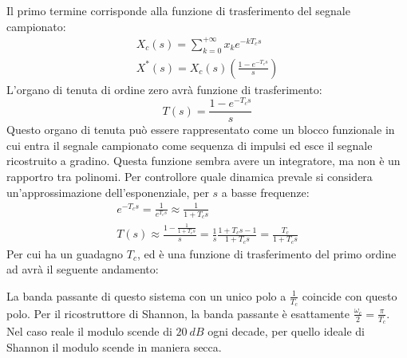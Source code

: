 \documentclass{article}
\numberwithin{equation}{subsection}
\begin{document}
Il primo termine corrisponde alla funzione di trasferimento del segnale campionato:
\begin{gather}
    X_c(s)=\sum_{k=0}^{+\infty}x_ke^{-kT_cs}\\
    X^*(s)=X_c(s)\left(\displaystyle\frac{1-e^{-T_cs}}{s}\right)
\end{gather}
L'organo di tenuta di ordine zero avrà funzione di trasferimento: 
\begin{equation}
    T(s)=\displaystyle\frac{1-e^{-T_cs}}{s}
\end{equation}
Questo organo di tenuta può essere rappresentato come un blocco funzionale in cui entra il segnale campionato come sequenza di impulsi ed esce il segnale ricostruito a gradino. 
Questa funzione sembra avere un integratore, ma non è un rapportro tra polinomi. Per controllore quale dinamica prevale si considera un'approssimazione dell'esponenziale, per 
$s$ a basse frequenze: 
\begin{gather}
    e^{-T_cs}=\displaystyle\frac{1}{e^{T_cs}}\approx\frac{1}{1+T_cs}\\
    T(s)\approx\displaystyle\frac{1-\displaystyle\frac{1}{1+T_cs}}{s}=\frac{1}{s}\frac{1+T_cs-1}{1+T_cs}=\frac{T_c}{1+T_cs}
\end{gather}
Per cui ha un guadagno $T_c$, ed è una funzione di trasferimento del primo ordine ad avrà il seguente andamento:
\begin{center}
\end{center}
La banda passante di questo sistema con un unico polo a $\displaystyle\frac{1}{T_c}$ coincide con questo polo. Per il ricostruttore di Shannon, la banda passante è esattamente 
$\displaystyle\frac{\omega_c}{2}=\frac{\pi}{T_c}$. Nel caso reale il modulo scende di $20\:dB$ ogni decade, per quello ideale di Shannon il modulo scende in maniera secca. 
\end{document}
